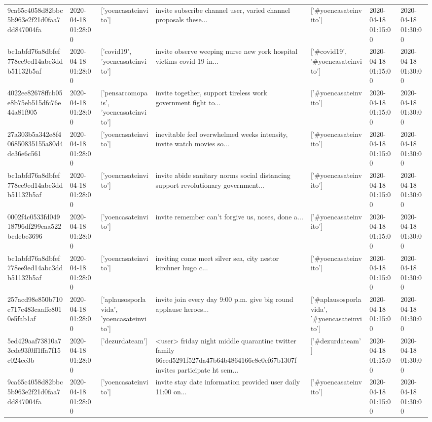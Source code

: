 \begin{tabular}{lllllll}
9ca65c4058d82bbc5b963e2f21d0faa7dd847004fa & 2020-04-18 01:28:00 & ['yoencasateinvito'] & invite subscribe channel user, varied channel proposals these... & ['#yoencasateinvito'] & 2020-04-18 01:15:00 & 2020-04-18 01:30:00 \\
bc1abfd76a8dbfef778ee9ed14abc3ddb51132b5af & 2020-04-18 01:28:00 & ['covid19', 'yoencasateinvito'] & invite observe weeping nurse new york hospital victims covid-19 in... & ['#covid19', '#yoencasateinvito'] & 2020-04-18 01:15:00 & 2020-04-18 01:30:00 \\
4022ee82678ffcb05e8b75eb515dfc76e44a81f905 & 2020-04-18 01:28:00 & ['pensarcomopais', 'yoencasateinvito'] & invite together, support tireless work government fight to... & ['#yoencasateinvito'] & 2020-04-18 01:15:00 & 2020-04-18 01:30:00 \\
27a303b5a342e8f406850835155a80d4dc36e6c561 & 2020-04-18 01:28:00 & ['yoencasateinvito'] & inevitable feel overwhelmed weeks intensity, invite watch movies so... & ['#yoencasateinvito'] & 2020-04-18 01:15:00 & 2020-04-18 01:30:00 \\
bc1abfd76a8dbfef778ee9ed14abc3ddb51132b5af & 2020-04-18 01:28:00 & ['yoencasateinvito'] & invite abide sanitary norms social distancing support revolutionary government... & ['#yoencasateinvito'] & 2020-04-18 01:15:00 & 2020-04-18 01:30:00 \\
0002f4c0533fd04918796df299eaa522bcdebe3696 & 2020-04-18 01:28:00 & ['yoencasateinvito'] & invite remember can't forgive us, noses, done a... & ['#yoencasateinvito'] & 2020-04-18 01:15:00 & 2020-04-18 01:30:00 \\
bc1abfd76a8dbfef778ee9ed14abc3ddb51132b5af & 2020-04-18 01:28:00 & ['yoencasateinvito'] & inviting come meet silver sea, city nestor kirchner hugo c... & ['#yoencasateinvito'] & 2020-04-18 01:15:00 & 2020-04-18 01:30:00 \\
257acd98e850b710c717c483caaffe8010e5fab1af & 2020-04-18 01:28:00 & ['aplausosporlavida', 'yoencasateinvito'] & invite join every day 9:00 p.m. give big round applause heroes... & ['#aplausosporlavida', '#yoencasateinvito'] & 2020-04-18 01:15:00 & 2020-04-18 01:30:00 \\
5ed429aaf73810a73cde93f0ff1ffa7f15c024ee3b & 2020-04-18 01:28:00 & ['dezurdateam'] & <user> friday night middle quarantine twitter family 66ced5291f527da47b64b4864166c8e0cf67b1307f invites participate ht sem... & ['#dezurdateam'] & 2020-04-18 01:15:00 & 2020-04-18 01:30:00 \\
9ca65c4058d82bbc5b963e2f21d0faa7dd847004fa & 2020-04-18 01:28:00 & ['yoencasateinvito'] & invite stay date information provided user daily 11:00 on... & ['#yoencasateinvito'] & 2020-04-18 01:15:00 & 2020-04-18 01:30:00 \\

\end{tabular}

